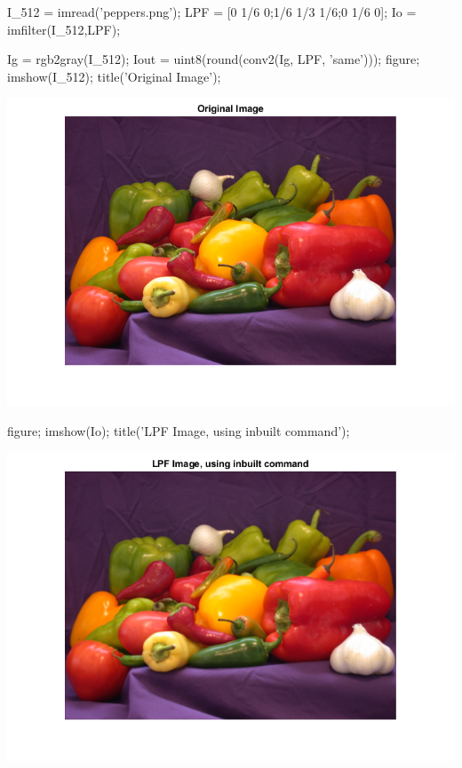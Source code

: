 \documentclass[12pt, onecolumn]{IEEEtran}
\begin{document}
\vspace{1em}
\begin{matlabcode}
I_512 =  imread('peppers.png'); %
LPF = [0 1/6 0;1/6 1/3 1/6;0 1/6 0]; %
Io = imfilter(I_512,LPF); %

Ig = rgb2gray(I_512); %
Iout = uint8(round(conv2(Ig, LPF, 'same')));  %
figure; imshow(I_512); title('Original Image'); %
\end{matlabcode}
\begin{center}
\includegraphics[width=\maxwidth{69.44305067737079em}]{figure_12.png}
\end{center}
\begin{matlabcode}
figure; imshow(Io); title('LPF Image, using inbuilt command'); %
\end{matlabcode}
\begin{center}
\includegraphics[width=\maxwidth{69.44305067737079em}]{figure_13.png}
\end{center}
\end{document}
